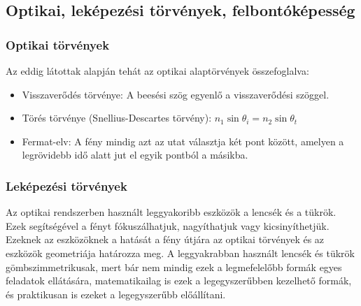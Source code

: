 \documentclass[a4paper,12pt]{article}
\begin{document}
\subsection{Optikai, leképezési törvények, felbontóképesség}
\subsubsection{Optikai törvények}
Az eddig látottak alapján tehát az optikai alaptörvények összefoglalva:
\begin{itemize}
    \item Visszaverődés törvénye: A beesési szög egyenlő a visszaverődési szöggel.
    \item Törés törvénye (Snellius-Descartes törvény): $n_1 \sin \theta_i = n_2 \sin \theta_t$
    \item Fermat-elv: A fény mindig azt az utat választja két pont között, amelyen a legrövidebb idő alatt jut el egyik pontból a másikba.
\end{itemize}

\subsubsection{Leképezési törvények}
Az optikai rendszerben használt leggyakoribb eszközök a lencsék és a tükrök. Ezek segítségével a fényt fókuszálhatjuk, nagyíthatjuk vagy kicsinyíthetjük.
Ezeknek az eszközöknek a hatását a fény útjára az optikai törvények és az eszközök geometriája határozza meg. A leggyakrabban használt lencsék és tükrök gömbszimmetrikusak,
mert bár nem mindig ezek a legmefelelőbb formák egyes feladatok ellátására, matematikailag is ezek a legegyszerűbben kezelhető formák, és praktikusan is ezeket a legegyszerűbb előállítani.
\end{document}
